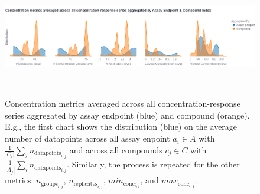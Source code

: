 \begin{figure}[htbp]  %
    \centering
    \includegraphics[width=1.0\textwidth]{figures/concentration_metric_distributions.png}  
    \caption{Concentration metrics averaged across all concentration-response series aggregated by assay endpoint (blue) and compound (orange). E.g., the first chart shows the distribution (blue) on the average number of datapoints across all assay enpoint $a_i \in A$ with $\frac{1}{|C_i|} \sum_{j} n_{\text{datapoints}_{i,j}}$ and across all compounds $c_j \in C$ with $\frac{1}{|A_j|} \sum_{i} n_{\text{datapoints}_{i,j}}$. Similarly, the process is repeated for the other metrics: $n_{\text{groups}_{i,j}}$, $n_{\text{replicates}_{i,j}}$, $min_{\text{conc}_{i,j}}$, and $max_{\text{conc}_{i,j}}$.
    }
~\label{fig:concentration_metric_distributions} 
\end{figure}


